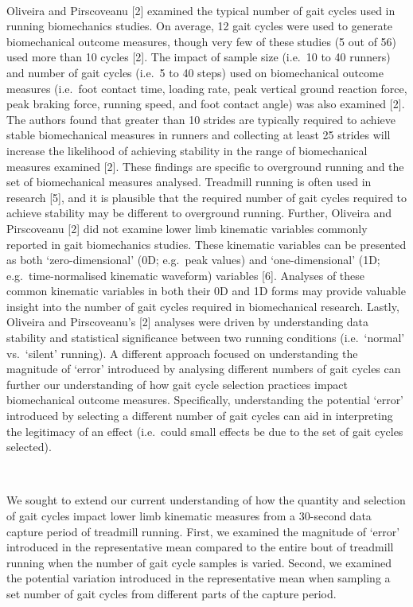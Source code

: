 \documentclass[]{elsarticle} %
\begin{document}
~

Oliveira and Pirscoveanu {[}2{]} examined the typical number of gait
cycles used in running biomechanics studies. On average, 12 gait cycles
were used to generate biomechanical outcome measures, though very few of
these studies (5 out of 56) used more than 10 cycles {[}2{]}. The impact
of sample size (i.e.~10 to 40 runners) and number of gait cycles (i.e.~5
to 40 steps) used on biomechanical outcome measures (i.e.~foot contact
time, loading rate, peak vertical ground reaction force, peak braking
force, running speed, and foot contact angle) was also examined {[}2{]}.
The authors found that greater than 10 strides are typically required to
achieve stable biomechanical measures in runners and collecting at least
25 strides will increase the likelihood of achieving stability in the
range of biomechanical measures examined {[}2{]}. These findings are
specific to overground running and the set of biomechanical measures
analysed. Treadmill running is often used in research {[}5{]}, and it is
plausible that the required number of gait cycles required to achieve
stability may be different to overground running. Further, Oliveira and
Pirscoveanu {[}2{]} did not examine lower limb kinematic variables
commonly reported in gait biomechanics studies. These kinematic
variables can be presented as both `zero-dimensional' (0D; e.g.~peak
values) and `one-dimensional' (1D; e.g.~time-normalised kinematic
waveform) variables {[}6{]}. Analyses of these common kinematic
variables in both their 0D and 1D forms may provide valuable insight
into the number of gait cycles required in biomechanical research.
Lastly, Oliveira and Pirscoveanu's {[}2{]} analyses were driven by
understanding data stability and statistical significance between two
running conditions (i.e.~`normal' vs.~`silent' running). A different
approach focused on understanding the magnitude of `error' introduced by
analysing different numbers of gait cycles can further our understanding
of how gait cycle selection practices impact biomechanical outcome
measures. Specifically, understanding the potential `error' introduced
by selecting a different number of gait cycles can aid in interpreting
the legitimacy of an effect (i.e.~could small effects be due to the set
of gait cycles selected).

~

We sought to extend our current understanding of how the quantity and
selection of gait cycles impact lower limb kinematic measures from a
30-second data capture period of treadmill running. First, we examined
the magnitude of `error' introduced in the representative mean compared
to the entire bout of treadmill running when the number of gait cycle
samples is varied. Second, we examined the potential variation
introduced in the representative mean when sampling a set number of gait
cycles from different parts of the capture period.
\end{document}
